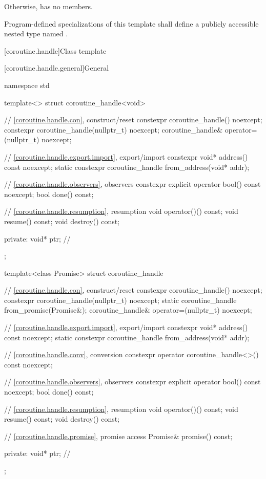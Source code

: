Otherwise,  has no members.

\pnum
Program-defined specializations of this template shall define a publicly
accessible nested type named .

[coroutine.handle]{Class template }

[coroutine.handle.general]{General}

%
\begin{codeblock}
namespace std {
  template<>
  struct coroutine_handle<void>
  {
    // \ref{coroutine.handle.con}, construct/reset
    constexpr coroutine_handle() noexcept;
    constexpr coroutine_handle(nullptr_t) noexcept;
    coroutine_handle& operator=(nullptr_t) noexcept;

    // \ref{coroutine.handle.export.import}, export/import
    constexpr void* address() const noexcept;
    static constexpr coroutine_handle from_address(void* addr);

    // \ref{coroutine.handle.observers}, observers
    constexpr explicit operator bool() const noexcept;
    bool done() const;

    // \ref{coroutine.handle.resumption}, resumption
    void operator()() const;
    void resume() const;
    void destroy() const;

  private:
    void* ptr;  // \expos
  };

  template<class Promise>
  struct coroutine_handle
  {
    // \ref{coroutine.handle.con}, construct/reset
    constexpr coroutine_handle() noexcept;
    constexpr coroutine_handle(nullptr_t) noexcept;
    static coroutine_handle from_promise(Promise&);
    coroutine_handle& operator=(nullptr_t) noexcept;

    // \ref{coroutine.handle.export.import}, export/import
    constexpr void* address() const noexcept;
    static constexpr coroutine_handle from_address(void* addr);

    // \ref{coroutine.handle.conv}, conversion
    constexpr operator coroutine_handle<>() const noexcept;

    // \ref{coroutine.handle.observers}, observers
    constexpr explicit operator bool() const noexcept;
    bool done() const;

    // \ref{coroutine.handle.resumption}, resumption
    void operator()() const;
    void resume() const;
    void destroy() const;

    // \ref{coroutine.handle.promise}, promise access
    Promise& promise() const;

  private:
    void* ptr;  // \expos
  };
}
\end{codeblock}

